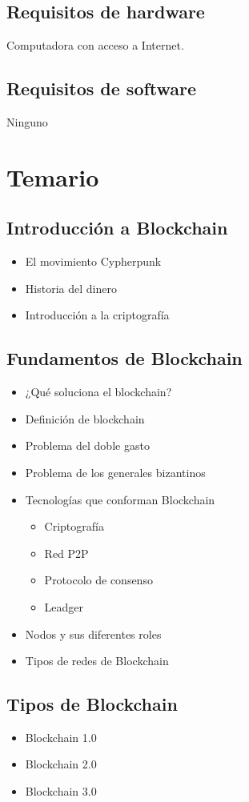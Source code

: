 \documentclass[a4paper,12pt]{/home/armando/Documentos/Cursos/LaTeX/Plantillas/lib/pub}
\begin{document}
\subsection{Requisitos de hardware}
Computadora con acceso a Internet.

\subsection{Requisitos de software}
Ninguno

\section{Temario}

\subsection{Introducción a Blockchain}
\begin{itemize}
	\item El movimiento Cypherpunk
	\item Historia del dinero
	\item Introducción a la criptografía
\end{itemize}
\subsection{Fundamentos de Blockchain}
\begin{itemize}
	\item ¿Qué soluciona el blockchain?
	\item Definición de blockchain
	\item Problema del doble gasto
	\item Problema de los generales bizantinos
	\item Tecnologías que conforman Blockchain
	\begin{itemize}
		\item Criptografía
		\item Red P2P
		\item Protocolo de consenso
		\item Leadger
	\end{itemize}
	\item Nodos y sus diferentes roles
	\item Tipos de redes de Blockchain
\end{itemize}
\subsection{Tipos de Blockchain}
\begin{itemize}
	\item Blockchain 1.0
	\item Blockchain 2.0
	\item Blockchain 3.0
\end{itemize}\newpage
\end{document}
